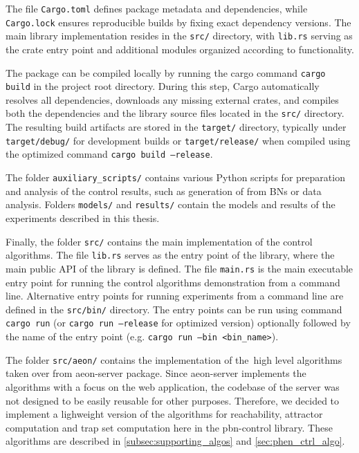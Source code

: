 The file \texttt{Cargo.toml} defines package metadata and dependencies, while
\texttt{Cargo.lock} ensures reproducible builds by fixing exact dependency
versions. The main library implementation resides in the \texttt{src/} directory,
with \texttt{lib.rs} serving as the crate entry point and additional modules
organized according to functionality. 

The package can be compiled locally by running the cargo command \texttt{cargo build} in the project root directory. During this step, Cargo automatically resolves all dependencies, downloads any missing external crates, and compiles both the dependencies and the library source files located in the \texttt{src/} directory. The resulting build artifacts are stored in the \texttt{target/} directory, typically under \texttt{target/debug/} for development builds or \texttt{target/release/} when compiled using the optimized command \texttt{cargo build --release}.

The folder \texttt{auxiliary\_scripts/} contains various Python scripts for preparation and analysis of the control results, such as generation of  from BNs or data analysis. Folders \texttt{models/} and \texttt{results/} contain the models and results of the experiments described in this thesis.

Finally, the folder \texttt{src/} contains the main implementation of the control algorithms. The file \texttt{lib.rs} serves as the entry point of the library, where the main public API of the library is defined. The file \texttt{main.rs} is the main executable entry point for running the control algorithms demonstration from a command line. Alternative entry points for running experiments from a command line are defined in the \texttt{src/bin/} directory. The entry points can be run using command \texttt{cargo run} (or \texttt{cargo run --release} for optimized version) optionally followed by the name of the entry point (e.g. \texttt{cargo run --bin <bin\_name>}).

The folder \texttt{src/aeon/} contains the implementation of the high level algorithms taken over from aeon-server package. Since aeon-server implements the algorithms with a focus on the web application, the codebase of the server was not designed to be easily reusable for other purposes. Therefore, we decided to implement a lighweight version of the algorithms for reachability, attractor computation and trap set computation here in the pbn-control library. These algorithms are described in \autoref{subsec:supporting_algos} and \autoref{sec:phen_ctrl_algo}.

